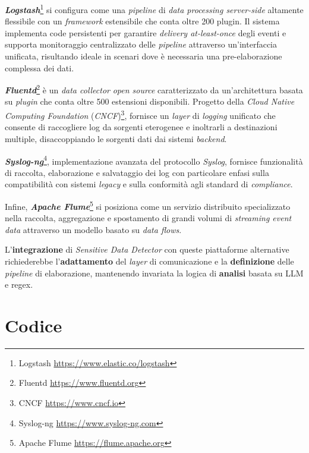 \documentclass[12pt,twoside]{report}
\begin{document}
\textbf{\textit{Logstash}}\footnote{Logstash \url{https://www.elastic.co/logstash}} si configura come una \textit{pipeline} di \textit{data processing server-side} altamente flessibile con un \textit{framework} estensibile che conta oltre 200 plugin. Il sistema implementa code persistenti per garantire \textit{delivery at-least-once} degli eventi e supporta monitoraggio centralizzato delle \textit{pipeline} attraverso un'interfaccia unificata, risultando ideale in scenari dove è necessaria una pre-elaborazione complessa dei dati.

\textbf{\textit{Fluentd}}\footnote{Fluentd \url{https://www.fluentd.org}} è un \textit{data collector} \textit{open source} caratterizzato da un'architettura basata su \textit{plugin} che conta oltre 500 estensioni disponibili. Progetto della \textit{Cloud Native Computing Foundation} (\textit{CNCF})\footnote{CNCF \url{https://www.cncf.io}}, fornisce un \textit{layer} di \textit{logging} unificato che consente di raccogliere log da sorgenti eterogenee e inoltrarli a destinazioni multiple, disaccoppiando le sorgenti dati dai sistemi \textit{backend}.

\textbf{\textit{Syslog-ng}}\footnote{Syslog-ng \url{https://www.syslog-ng.com}}, implementazione avanzata del protocollo \textit{Syslog}, fornisce funzionalità di raccolta, elaborazione e salvataggio dei log con particolare enfasi sulla compatibilità con sistemi \textit{legacy} e sulla conformità agli standard di \textit{compliance}.

Infine, \textbf{\textit{Apache Flume}}\footnote{Apache Flume \url{https://flume.apache.org}} si posiziona come un servizio distribuito specializzato nella raccolta, aggregazione e spostamento di grandi volumi di \textit{streaming event data} attraverso un modello basato su \textit{data flows}.

L'\textbf{integrazione} di \textit{Sensitive Data Detector} con queste piattaforme alternative richiederebbe l'\textbf{adattamento} del \textit{layer} di comunicazione e la \textbf{definizione} delle \textit{pipeline} di elaborazione, mantenendo invariata la logica di \textbf{analisi} basata su LLM e regex.



%
%

\appendix

\cleardoublepage
\chapter{Codice}
\label{chap:appendice_codice}
\end{document}
